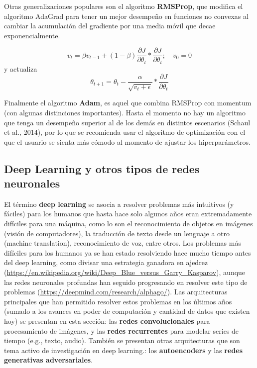 Otras generalizaciones populares son el algoritmo \textbf{RMSProp}, que modifica el algoritmo AdaGrad para tener un mejor desempe{\~{n}}o en funciones no convexas al cambiar la acumulaci\'on del gradiente por una media m\'ovil que decae exponencialmente.

\[
v_t = \beta v_{t-1} + (1-\beta)\frac{\partial J}{\partial \theta_t} * \frac{\partial J}{\partial \theta_t} ; \quad v_0 = 0
\] 
y actualiza 
\[
\theta_{t+1} = \theta_t - \frac{\alpha}{\sqrt{v_t + \epsilon}} * \frac{\partial J}{\partial \theta_t}
\] 


Finalmente  el algoritmo \textbf{Adam}, es aquel que combina RMSProp con momentum (con algunas distinciones importantes). Hasta el momento no hay un algoritmo que tenga un desempe{\~{n}}o superior al de los dem\'as en distintos escenarios (Schaul et al., 2014), por lo que se recomienda usar el algoritmo de optimizaci\'on con el que el usuario se sienta m\'as c\'omodo al momento de ajustar los hiperpar\'ametros.

\subsection{Deep Learning y otros tipos de redes neuronales}

El t\'ermino \textbf{deep learning} se asocia a resolver problemas m\'as intuitivos (y f\'aciles) para los humanos que hasta hace solo algunos a{\~{n}}os eran extremadamente dif\'iciles para una m\'aquina, como lo son el reconocimiento de objetos en im\'agenes (visi\'on de computadores), la traducci\'on de texto desde un lenguaje a otro (machine translation), reconocimiento de voz, entre otros. Los problemas m\'as dif\'iciles para los humanos ya se han estado resolviendo hace mucho tiempo antes del deep learning, como divisar una estrategia ganadora en ajedrez (\url{https://en.wikipedia.org/wiki/Deep_Blue_versus_Garry_Kasparov}), aunque las redes neuronales profundas han seguido progresando en resolver este tipo de problemas (\url{https://deepmind.com/research/alphago/}). Las arquitecturas principales que han permitido resolver estos problemas en los \'ultimos a{\~{n}}os (sumado a los avances en poder de computaci\'on y cantidad de datos que existen hoy) se presentan en esta secci\'on: las \textbf{redes convolucionales} para procesamiento de im\'agenes, y las \textbf{redes recurrentes} para modelar series de tiempo (e.g., texto, audio). Tambi\'en se presentan otras arquitecturas que son tema activo de investigaci\'on en deep learning.: los \textbf{autoencoders} y las \textbf{redes generativas adversariales}.


